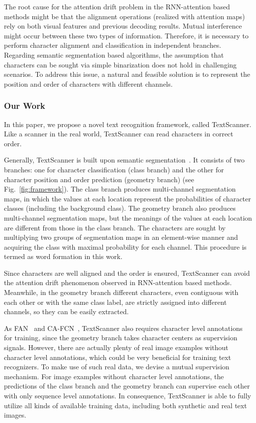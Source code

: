 \documentclass[letterpaper]{article} \usepackage{aaai20}  \usepackage{times}  \usepackage{helvet} \usepackage{courier}  \usepackage[hyphens]{url}  \usepackage{graphicx} \urlstyle{rm} \def\UrlFont{\rm}  \usepackage{graphicx}  \frenchspacing  \setlength{\pdfpagewidth}{8.5in}  \setlength{\pdfpageheight}{11in}
\begin{document}
The root cause for the attention drift problem in the RNN-attention based methods might be that the alignment operations (realized with attention maps) rely on both visual features and previous decoding results. Mutual interference might occur between these two types of information. Therefore, it is necessary to perform character alignment and classification in independent branches. Regarding semantic segmentation based algorithms, the assumption that characters can be sought via simple binarization does not hold in challenging scenarios. To address this issue, a natural and feasible solution is to represent the position and order of characters with different channels.

\subsubsection{Our Work}

In this paper, we propose a novel text recognition framework, called TextScanner. Like a scanner in the real world, TextScanner can read characters in correct order.

Generally, TextScanner is built upon semantic segmentation~\cite{ca-fcn}. It consists of two branches: one for character classification (class branch) and the other for character position and order prediction (geometry branch) (see Fig.~\ref{fig:framework}). The class branch produces multi-channel segmentation maps, in which the values at each location represent the probabilities of character classes (including the background class). The geometry branch also produces multi-channel segmentation maps, but the meanings of the values at each location are different from those in the class branch. The characters are sought by multiplying two groups of segmentation maps in an element-wise manner and acquiring the class with maximal probability for each channel. This procedure is termed as word formation in this work.

Since characters are well aligned and the order is ensured, TextScanner can avoid the attention drift phenomenon observed in RNN-attention based methods. Meanwhile, in the geometry branch different characters, even contiguous with each other or with the same class label, are strictly assigned into different channels, so they can be easily extracted.

As FAN~\cite{cheng2017fan} and CA-FCN~\cite{ca-fcn}, TextScanner also requires character level annotations for training, since the geometry branch takes character centers as supervision signals. However, there are actually plenty of real image examples without character level annotations, which could be very beneficial for training text recognizers. To make use of such real data, we devise a mutual supervision mechanism. For image examples without character level annotations, the predictions of the class branch and the geometry branch can supervise each other with only sequence level annotations. In consequence, TextScanner is able to fully utilize all kinds of available training data, including both synthetic and real text images.
\end{document}
